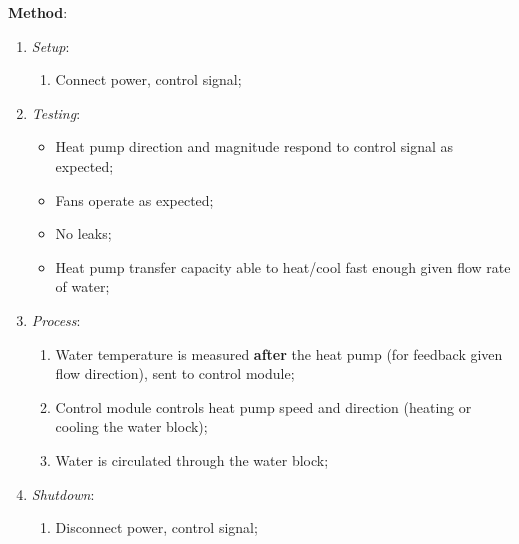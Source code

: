 \documentclass{report}
\begin{document}
\textbf{Method}:
\begin{enumerate}
    \item \textit{Setup}:
    \begin{enumerate}
        \item Connect power, control signal;
    \end{enumerate}
    \item \textit{Testing}:
    \begin{itemize}
        \item Heat pump direction and magnitude respond to control signal as expected;
        \item Fans operate as expected;
        \item No leaks;
        \item Heat pump transfer capacity able to heat/cool fast enough given flow rate of water;
    \end{itemize}
    \item \textit{Process}:
    \begin{enumerate}
        \item Water temperature is measured \textbf{after} the heat pump (for feedback given flow direction), sent to control module;
        \item Control module controls heat pump speed and direction (heating or cooling the water block);
        \item Water is circulated through the water block;
    \end{enumerate}
    \item \textit{Shutdown}:
    \begin{enumerate}
        \item Disconnect power, control signal;
    \end{enumerate}
\end{enumerate}
\end{document}

